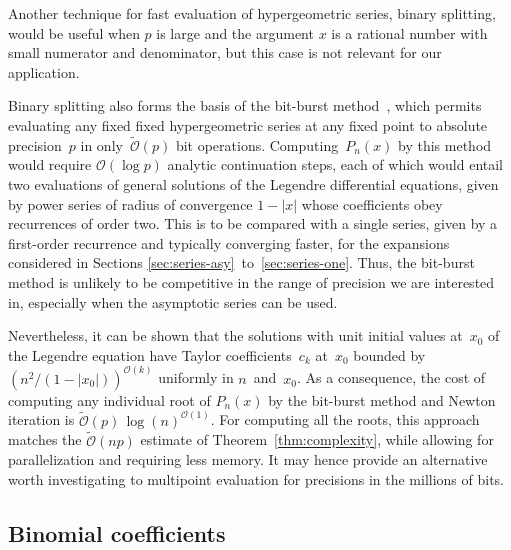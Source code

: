 \documentclass{siamart0216}
\newcommand{\OO}{\mathcal{O}}
\newcommand{\OOtilde}{\widetilde{\mathcal{O}}}
\begin{document}
Another technique for fast evaluation of hypergeometric series,
binary splitting, would be useful when $p$ is large and the
argument $x$ is a rational number with small numerator and denominator,
but this case is not relevant for our application.

Binary splitting also forms the basis of the bit-burst
method~\cite[Section 4]{ChudnovskyChudnovsky1990}, which permits
evaluating any fixed fixed hypergeometric series at any fixed point to
absolute precision~$p$ in only~$\OOtilde(p)$ bit operations.
Computing~$P_n(x)$ by this method would require $\OO(\log p)$ analytic
continuation steps, each of which would entail two evaluations of
general solutions of the Legendre differential equations, given by
power series of radius of convergence $1 - |x|$ whose coefficients
obey recurrences of order two.
This is to be compared with a single series, given by a first-order
recurrence and typically converging faster, for the expansions
considered in Sections \ref{sec:series-asy}~to~\ref{sec:series-one}.
Thus, the bit-burst method is unlikely to be competitive in the range
of precision we are interested in, especially when the asymptotic
series can be used.

Nevertheless, it can be shown that the solutions with unit initial
values at~$x_0$ of the Legendre equation have Taylor
coefficients~$c_k$ at~$x_0$ bounded by
$(n^2/(1-|x_0|))^{\OO(k)}$
uniformly in $n$~and~$x_0$.
As a consequence, the cost of computing any individual root of
$P_n(x)$ by the bit-burst method and Newton iteration is
$\OOtilde(p) \, \log(n)^{\OO(1)}$.
For computing all the roots, this approach matches the $\OOtilde(np)$
estimate of Theorem~\ref{thm:complexity}, while allowing for
parallelization and requiring less memory.
It may hence provide an alternative worth investigating to multipoint
evaluation for precisions in the millions of bits.

\subsection{Binomial coefficients}
\end{document}
